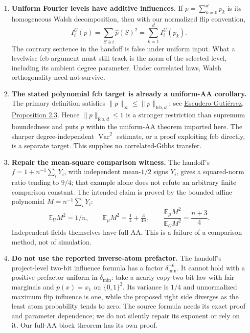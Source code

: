 \begin{enumerate}
\item \textbf{Uniform Fourier levels have additive influences.}
If $p=\sum_{k=0}^d p_k$ is its homogeneous Walsh decomposition, then
with our normalized flip convention,
\[
 I_i^U(p)=\sum_{S\ni i}\widehat p(S)^2
         =\sum_{k=1}^d I_i^U(p_k).
\]
The contrary sentence in the handoff is false under uniform input.
What a levelwise fcb argument must still track is the norm of the
selected level, including its ambient degree parameter. Under
correlated laws, Walsh orthogonality need not survive.

\item \textbf{The stated polynomial fcb target is already a uniform-AA
corollary.} The primary definition satisfies
$\|p\|_\infty\le\|p\|_{\mathrm{fcb},d}$; see
\href{https://arxiv.org/abs/2304.06713v2}{Escudero Guti\'errez,
Proposition 2.3}. Hence $\|p\|_{\mathrm{fcb},d}\le1$ is a stronger
restriction than supremum boundedness and puts $p$ within the
uniform-AA theorem imported here. The sharper degree-independent
$\operatorname{Var}^2$ estimate, or a proof exploiting fcb directly,
is a separate target. This supplies no correlated-Gibbs transfer.

\item \textbf{Repair the mean-square comparison witness.}
The handoff's $f=1+n^{-1}\sum_iY_i$, with independent mean-$1/2$
signs $Y_i$, gives a squared-norm ratio tending to $9/4$; that example
alone does not refute an arbitrary finite comparison constant. The
intended claim is proved by the bounded affine polynomial
$M=n^{-1}\sum_iY_i$:
\[
 \mathbb E_U M^2=1/n,\qquad
 \mathbb E_\mu M^2=\tfrac14+\tfrac{3}{4n},\qquad
 \frac{\mathbb E_\mu M^2}{\mathbb E_U M^2}=\frac{n+3}{4}.
\]
Independent fields themselves have full AA. This is a failure of a
comparison method, not of simulation.

\item \textbf{Do not use the reported inverse-atom prefactor.}
The handoff's project-level two-bit influence formula has a factor
$\delta_{\min}^{-6}$. It cannot hold with a positive prefactor uniform
in $\delta_{\min}$: take a nearly-copy two-bit law with fair marginals
and $p(x)=x_1$ on $\{0,1\}^2$. Its variance is $1/4$ and unnormalized
maximum flip influence is one, while the proposed right side diverges
as the least atom probability tends to zero. The source formula needs
its exact proof and parameter dependence; we do not silently repair
its exponent or rely on it. Our full-AA block theorem has its own proof.


\end{enumerate}
